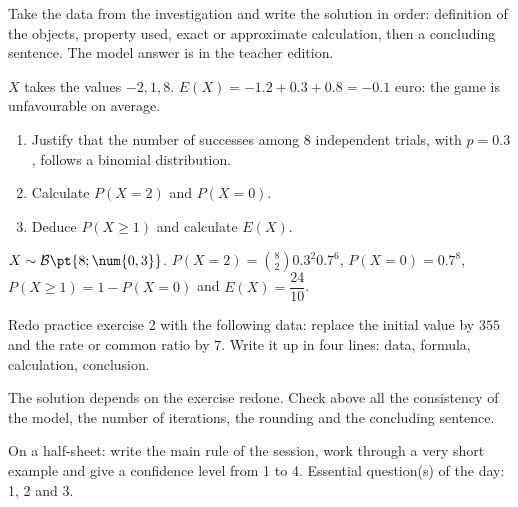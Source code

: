 \begin{example}
Take the data from the investigation and write the solution in order: definition of the objects, property used, exact or approximate calculation, then a concluding sentence. The model answer is in the teacher edition.
\end{example}
\begin{solution}$X$ takes the values $-2,1,8$. $E(X)=-\num{1,2}+\num{0,3}+\num{0,8}=-\num{0,1}$ euro: the game is unfavourable on average.\end{solution}

\begin{exercise}[essential]
\begin{enumerate}\item Justify that the number of successes among $8$ independent trials, with $p=\num{0,3}$, follows a binomial distribution.\item Calculate $P(X=2)$ and $P(X=0)$.\item Deduce $P(X\geq1)$ and calculate $E(X)$.\end{enumerate}
\end{exercise}
\begin{solution}$X\sim\mathcal B\pt{8;\num{0,3}}$. $P(X=2)=\binom{8}2 \num{0,3}^2 \num{0,7}^{6}$, $P(X=0)=\num{0,7}^{8}$, $P(X\geq1)=1-P(X=0)$ and $E(X)=\dfrac{24}{10}$.\end{solution}


\begin{homework}Redo practice exercise 2 with the following data: replace the initial value by $355$ and the rate or common ratio by $7$. Write it up in four lines: data, formula, calculation, conclusion.\end{homework}
\begin{solution}The solution depends on the exercise redone. Check above all the consistency of the model, the number of iterations, the rounding and the concluding sentence.\end{solution}

\begin{exitticket}[3 minutes]On a half-sheet: write the main rule of the session, work through a very short example and give a confidence level from 1 to 4. Essential question(s) of the day: 1, 2 and 3.\end{exitticket}

